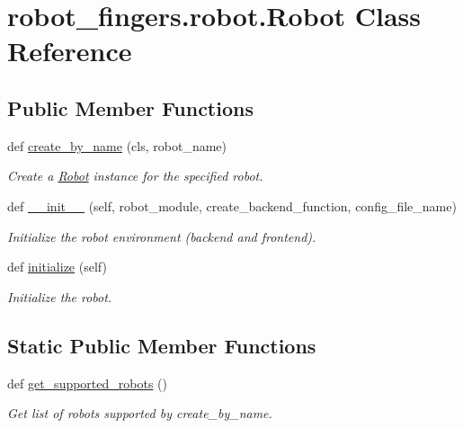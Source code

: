 \hypertarget{classrobot__fingers_1_1robot_1_1Robot}{}\section{robot\+\_\+fingers.\+robot.\+Robot Class Reference}
\label{classrobot__fingers_1_1robot_1_1Robot}
\subsection*{Public Member Functions}
\begin{DoxyCompactItemize}
\item 
def \hyperlink{classrobot__fingers_1_1robot_1_1Robot_ab861541dfe9f4689d9c3f842b2cd8a4e}{create\+\_\+by\+\_\+name} (cls, robot\+\_\+name)
\begin{DoxyCompactList}\small\item\em Create a {\ttfamily \hyperlink{classrobot__fingers_1_1robot_1_1Robot}{Robot}} instance for the specified robot. \end{DoxyCompactList}\item 
def \hyperlink{classrobot__fingers_1_1robot_1_1Robot_a47fe6f4f534c2e30d129f931b586590f}{\+\_\+\+\_\+init\+\_\+\+\_\+} (self, robot\+\_\+module, create\+\_\+backend\+\_\+function, config\+\_\+file\+\_\+name)
\begin{DoxyCompactList}\small\item\em Initialize the robot environment (backend and frontend). \end{DoxyCompactList}\item 
def \hyperlink{classrobot__fingers_1_1robot_1_1Robot_a68fd76fde66f13b697e2492932b2dca5}{initialize} (self)
\begin{DoxyCompactList}\small\item\em Initialize the robot. \end{DoxyCompactList}\end{DoxyCompactItemize}
\subsection*{Static Public Member Functions}
\begin{DoxyCompactItemize}
\item 
def \hyperlink{classrobot__fingers_1_1robot_1_1Robot_ae4d1f723105c1d3c00c49db2e7c283ae}{get\+\_\+supported\+\_\+robots} ()
\begin{DoxyCompactList}\small\item\em Get list of robots supported by {\ttfamily create\+\_\+by\+\_\+name}. \end{DoxyCompactList}\end{DoxyCompactItemize}
